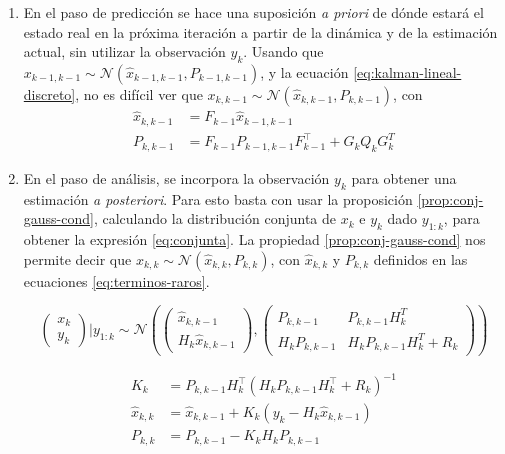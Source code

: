 \begin{enumerate}
\def\labelenumi{\arabic{enumi}.}
\item
  En el paso de predicción se hace una suposición \emph{a priori} de dónde estará el estado real en la próxima iteración a partir de la dinámica y de la estimación actual, sin utilizar la observación \(y_k\). Usando que \(x_{k-1,k-1} \sim \mathcal{N}(\hat{x}_{k-1,k-1}, P_{k-1,k-1})\), y la ecuación \ref{eq:kalman-lineal-discreto}, no es difícil ver que \(x_{k,k-1} \sim \mathcal{N}(\hat{x}_{k,k-1}, P_{k,k-1})\), con 
    \begin{equation}
    \begin{aligned}
    \hat{x}_{k,k-1} &= F_{k-1} \hat{x}_{k-1,k-1} \\
    P_{k,k-1} &= F_{k-1} P_{k-1,k-1} F_{k-1}^{\top} + G_k Q_k G_k^T
    \end{aligned}
    \end{equation}
\item
  En el paso de análisis, se incorpora la observación \(y_k\) para obtener una estimación \emph{a posteriori}. Para esto basta con usar la proposición \ref{prop:conj-gauss-cond}, calculando la distribución conjunta de \(x_k\) e \(y_k\) dado \(y_{1:k}\), para obtener la expresión \ref{eq:conjunta}. La propiedad \ref{prop:conj-gauss-cond} nos permite decir que \(
    x_{k,k} \sim
     \mathcal{N} \left( \hat{x}_{k,k}, P_{k,k} \right)
    \), con \(\hat{x}_{k,k}\) y \(P_{k,k}\) definidos en las ecuaciones \ref{eq:terminos-raros}.
  
    \begin{equation}\label{eq:conjunta}
    \begin{pmatrix}
    x_k \\
    y_k
    \end{pmatrix} \Big| y_{1:k} \sim \mathcal{N}\left(
    \begin{pmatrix}
    \hat{x}_{k, k-1} \\
    H_k \hat{x}_{k,k-1}
    \end{pmatrix},
    \begin{pmatrix}
    P_{k,k-1} & P_{k,k-1} H^T_{k}\\
    H_{k}P_{k,k-1}  & H_{k}P_{k,k-1}H_{k}^T + R_k
    \end{pmatrix}  
    \right)
    \end{equation}

    \begin{equation}\label{eq:terminos-raros}
    \begin{aligned}
    K_k &= P_{k,k-1} H^{\top}_{k}(H_{k}P_{k,k-1}H_{k}^{\top} + R_k)^{-1}\\
    \hat{x}_{k,k} &= \hat{x}_{k, k-1} + K_k(y_k-H_k \hat{x}_{k,k-1}) \\
    P_{k,k} &= P_{k,k-1}- K_k H_{k}P_{k,k-1} \\
    \end{aligned}
    \end{equation}
\end{enumerate}
